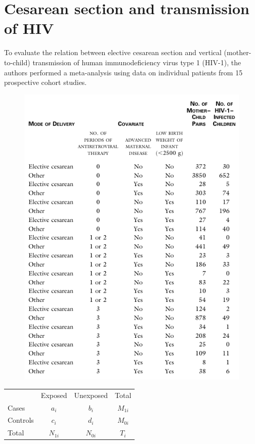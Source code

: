 \documentclass[landscape,twocolumn,letterpaper,9pt,reqno]{article}\usepackage[]{graphicx}\usepackage[]{color}
\begin{document}
	


\section{Cesarean section and transmission of HIV}

\vspace{-0.1in}

To evaluate the relation between elective cesarean section and vertical (mother-to-child) transmission of human immunodeficiency virus type 1 (HIV-1), the authors performed a meta-analysis using data on individual patients from 15 prospective cohort studies.

\begin{figure}[h]
	\centering
	\includegraphics[scale=1.1]{hivtable.pdf}
\end{figure}




\begin{table}[H]
	\centering
	\begin{tabular}{lcc|c}
			     & Exposed  &   Unexposed & Total  \\		
		Cases    & $a_i$ &  $b_i$ & $M_{1i}$ \\
		Controls & $c_i$ 	& $d_i$  	& $M_{0i}$ 	\\	
		\hline
		Total & $N_{1i}$ & $N_{0i}$ 	& $T_i$
	\end{tabular}
\end{table}
\end{document}
